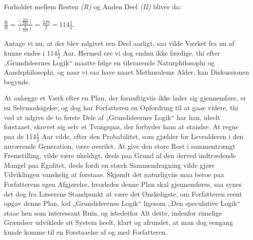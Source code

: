 \documentclass[12pt,a4paper]{book}
\newcommand{\opage}[1]{\marginnote{\footnotesize\textit{[#1]}}}
\begin{document}
Forholdet mellem Resten \textit{(R)} og Anden Deel \textit{(II)}
bliver da:
\begin{flushleft}
\hspace*{0.22\linewidth}$\displaystyle\frac{\mathrm{R}}{\mathrm{II}}=\frac{(\frac{229}{243})}{(\frac{2}{243})}=\tfrac{229}{2}=114\tfrac{1}{2}.$
\end{flushleft}

Antage vi nu, at der blev ndgivet een Deel aarligt,
saa vilde Værket fra nu af kunne endes i 114$\frac{1}{2}$
Aar. Hermed ere vi dog endnu ikke færdige, thi efter
„Grundideernes Logik“ maatte følge en tilsvarende Naturphilosophi
og Aandsphilosophi, og naar vi saa have
naaet Methusalems Alder, kan Diskussionen begynde.

At anlægge et Værk efter en Plan, der fornuftigviis
ikke lader sig gjennemføre, er en Selvmodsigelse; og
dog har Forfatteren en Opfordring til at gaae videre,
thi ved at udgive de to første Dele af „Grundideernes
Logik“ har han, ideelt forstaaet, skrevet sig selv et
Tvangspas, der forbyder ham at standse. At regne paa
de 114$\frac{1}{2}$ Aar vilde, efter den Probabilitet, som gjælder
for Levealderen i den nuværende Generation, være overilet.
At give den store Rest i sammentrængt Fremstilling,
vilde være uheldigt, deels paa Grund af den derved
indtrædende Mangel paa Egalitet, deels fordi en
stærk Sammendragning vilde gjøre Udviklingen vanskelig
at forstaae. Skjøndt det naturligviis maa beroe paa
\opage{96}\setcounter{footnote}{0}Forfatterens egen Afgjørelse, hvorledes denne Plan skal
gjennemføres, saa synes det dog fra Læserens Standpunkt
at være det Ønskeligste, om Forfatteren reent opgav
denne Plan, lod „Grundideernes Logik“ ligesom
„Den speculative Logik“ staae hen som interessant Ruin,
og istedetfor Alt dette, indenfor rimelige Grændser udviklede
sit System heelt, klart og afrundet, at man dog
eengang kunde komme til en Forstaaelse af og med
Forfatteren.
\end{document}
